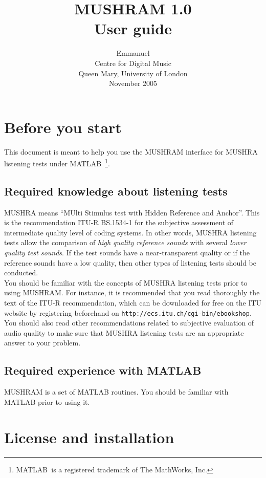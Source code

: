 \documentclass[11pt,a4paper]{book}
\title{\Huge \bf MUSHRAM 1.0\protect\\\vspace{.5cm}
\LARGE User guide}
\author{\Large  Emmanuel \sc{Vincent}\\
Centre for Digital Music\\
Queen Mary, University of London\\
November 2005}
\date{}
\newcommand{\matlab}[0] {MATLAB\textregistered\ }
\begin{document}
\maketitle

\vfill
 \tableofcontents

\vfill

\chapter{Before you start}
This document is meant to help you use the MUSHRAM interface for MUSHRA listening tests under \matlab\footnote{\matlab is a registered trademark of The MathWorks, Inc.}.

\section{Required knowledge about listening tests}
MUSHRA means ``MUlti Stimulus test with Hidden Reference and Anchor''. This is the recommendation ITU-R BS.1534-1 \cite{ITU03} for the subjective assessment of intermediate quality level of coding systems. In other words, MUSHRA listening tests allow the comparison of \textit{high quality reference sounds} with several \textit{lower quality test sounds}. If the test sounds have a near-transparent quality or if the reference sounds have a low quality, then other types of listening tests should be conducted.\\

You should be familiar with the concepts of MUSHRA listening tests prior to using MUSHRAM. For instance, it is recommended that you read thoroughly the text of the ITU-R recommendation, which can be downloaded for free on the ITU website by registering beforehand on \texttt{http://ecs.itu.ch/cgi-bin/ebookshop}. You should also read other recommendations related to subjective evaluation of audio quality to make sure that MUSHRA listening tests are an appropriate answer to your problem.

\section{Required experience with MATLAB}
MUSHRAM is a set of MATLAB routines. You should be familiar with MATLAB prior to using it. 
\vfill

\chapter{License and installation}
\end{document}
